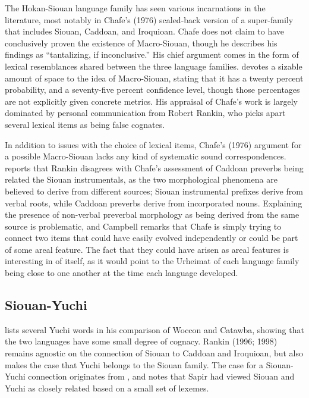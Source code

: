 \documentclass[output=paper]{LSP/langsci}
\begin{document}
{The Hokan-Siouan language family has seen various incarnations in the literature, most notably in Chafe's (1976) scaled-back version of a super-family that includes Siouan, Caddoan, and Iroquioan. Chafe does not claim to have conclusively proven the existence of Macro-Siouan, though he describes his findings as ``tantalizing, if inconclusive.'' His chief argument comes in the form of lexical resemblances shared between the three language families. \citet{Campbell2000} devotes a sizable amount of space to the idea of Macro-Siouan, stating that it has a twenty percent probability, and a seventy-five percent confidence level, though those percentages are not explicitly given concrete metrics. His appraisal of Chafe's work is largely dominated by personal communication from Robert Rankin, who picks apart several lexical items as being false cognates.

In addition to issues with the choice of lexical items, Chafe's (1976) argument for a possible Macro-Siouan lacks any kind of systematic sound correspondences. \citet{Campbell2000} reports that Rankin disagrees with Chafe's assessment of Caddoan preverbs being related the Siouan instrumentals, as the two morphological phenomena are believed to derive from different sources; Siouan instrumental prefixes derive from verbal roots, while Caddoan preverbs derive from incorporated nouns. Explaining the presence of non-verbal preverbal morphology as being derived from the same source is problematic, and Campbell remarks that Chafe is simply trying to connect two items that could have easily evolved independently or could be part of some areal feature. The fact that they could have arisen as areal features is interesting in of itself, as it would point to the Urheimat of each language family being close to one another at the time each language developed.

\subsection{Siouan-Yuchi}

\citet{Carter1980} lists several Yuchi words in his comparison of Woccon and Catawba, showing that the two languages have some small degree of cognacy. Rankin (1996; 1998) remains agnostic on the connection of Siouan to Caddoan and Iroquioan, but also makes the case that Yuchi belongs to the Siouan family. The case for a Siouan-Yuchi connection originates from \citet{Sapir1929}, and \citet{Haas1952} notes that Sapir had viewed Siouan and Yuchi as closely related based on a small set of lexemes.

}
\end{document}
